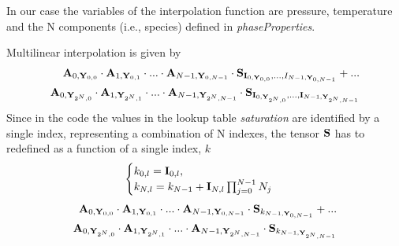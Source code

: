 \documentclass[a4paper, 12 pt, fleqn]{article}
\begin{document}
In our case the variables of the interpolation function are pressure, temperature and the N components (i.e., species) defined in \textit {phaseProperties}.

 
Multilinear interpolation is given by 
\begin{eqnarray}
\bold{A}_{0,\bold{Y}_{0,0}} \cdot \bold{A}_{1,\bold{Y}_{0,1}} \cdot ... \cdot \bold{A}_{N-1,\bold{Y}_{0,N-1}} \cdot \bold{S}_{\bold{I}_{0,\bold{Y}_{0,0}},...,I_{N-1,\bold{Y}_{0,N-1}}} + ... \\
\bold{A}_{0,\bold{Y}_{2^N,0}} \cdot \bold{A}_{1,\bold{Y}_{2^N,1}} \cdot ... \cdot \bold{A}_{N-1,\bold{Y}_{2^N,N-1}} \cdot \bold{S}_{\bold{I}_{0,\bold{Y}_{2^N,0}},...,\bold{I}_{N-1,\bold{Y}_{2^N,N-1}}}
\end{eqnarray}
Since in the code the values in the lookup table \textit{saturation} are identified by a single index, representing a combination of N indexes, the tensor $\bold{S}$ has to redefined as a function of a single index, $k$
\begin{eqnarray}
\begin{cases} k_{0,l} = \bold{I}_{0,l}, \\ 
k_{N,l} = k_{N-1} + \bold{I}_{N,l}\prod_{j=0}^{N-1} N_j \end{cases}
\end{eqnarray}
\begin{eqnarray}
\bold{A}_{0,\bold{Y}_{0,0}} \cdot \bold{A}_{1,\bold{Y}_{0,1}} \cdot ... \cdot \bold{A}_{N-1,\bold{Y}_{0,N-1}} \cdot \bold{S}_{k_{N-1,\bold{Y}_{0,N-1}}} + ... \\
\bold{A}_{0,\bold{Y}_{2^N,0}} \cdot \bold{A}_{1,\bold{Y}_{2^N,1}} \cdot ... \cdot \bold{A}_{N-1,\bold{Y}_{2^N,N-1}} \cdot \bold{S}_{k_{N-1,\bold{Y}_{2^N,N-1}}}
\end{eqnarray}
\end{document}
